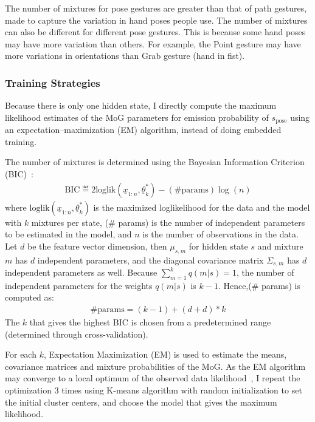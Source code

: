 The number of mixtures for pose gestures are greater than that of path
gestures, made to capture the variation in hand poses people use. The number
of mixtures can also be different for different pose gestures.
This is because some hand poses may have more variation than others.
For example, the Point gesture may have more variations in orientations than
Grab gesture (hand in fist).

\subsubsection{Training Strategies}\label{sec:pose-gesture}
Because there is only
one hidden state, I directly compute the maximum likelihood estimates of the MoG
parameters for emission probability of $s_{\text{pose}}$ using an
expectation--maximization (EM) algorithm, instead of doing embedded training.

The number of mixtures is
determined using the Bayesian Information Criterion (BIC)~\cite{fraley06}:
\begin{align*}
\text{BIC}\eqdef2\text{loglik}(\underline{x}_{1:n}, \underline{\theta}_k^*) -
(\text{\# params})\log(n)
\end{align*}
where $\text{loglik}(\underline{x}_{1:n}, \underline{\theta}_k^*)$ is the
maximized loglikelihood for the data and the model with $k$ mixtures per state, (\# params) is the number of independent parameters to be estimated in the model, and $n$ is the number of observations in
the data. Let $d$ be the feature vector dimension, then $\mu_{s,m}$ for
hidden state $s$ and mixture $m$ has $d$ independent parameters, and the
diagonal covariance matrix $\Sigma_{s,m}$ has $d$ independent parameters as
well. Because $\sum_{m=1}^k q(m | s) = 1$, the number of independent parameters
for the weights $q(m|s)$ is $k - 1$. Hence,(\# params) is computed as:
\begin{align*}
\text{\# params} = (k - 1) + (d + d) * k
\end{align*}
The $k$ that gives the highest BIC is chosen from a predetermined range
(determined through cross-validation).

For each $k$, Expectation Maximization (EM) is used to estimate the means,
covariance matrices and mixture probabilities of the MoG. As the EM algorithm may
converge to a local optimum of the observed data likelihood~\cite{dicintio12}, I
repeat the optimization 3 times using K-means algorithm with random
initialization to set the initial cluster centers, and choose the model that
gives the maximum likelihood.

